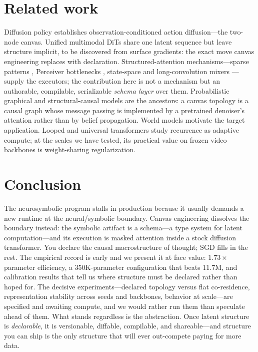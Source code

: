 \documentclass[10pt,twocolumn]{article}
\begin{document}
\section{Related work}

Diffusion policy \cite{chi2023diffusion} establishes observation-conditioned action diffusion---the two-node canvas. Unified multimodal DiTs \cite{peebles2023dit,yang2024cogvideox} share one latent sequence but leave structure implicit, to be discovered from surface gradients: the exact move canvas engineering replaces with declaration. Structured-attention mechanisms---sparse patterns \cite{child2019sparse}, Perceiver bottlenecks \cite{jaegle2021perceiver}, state-space and long-convolution mixers \cite{gu2023mamba,peng2023rwkv,poli2023hyena}---supply the executors; the contribution here is not a mechanism but an authorable, compilable, serializable \emph{schema layer} over them. Probabilistic graphical and structural-causal models \cite{koller2009pgm,pearl2009causality} are the ancestors: a canvas topology is a causal graph whose message passing is implemented by a pretrained denoiser's attention rather than by belief propagation. World models \cite{ha2018worldmodels,hafner2023dreamerv3,lecun2022path} motivate the target application. Looped and universal transformers \cite{dehghani2019universal,schwarzschild2021thinking} study recurrence as adaptive compute; at the scales we have tested, its practical value on frozen video backbones is weight-sharing regularization.

\section{Conclusion}

The neurosymbolic program stalls in production because it usually demands a new runtime at the neural/symbolic boundary. Canvas engineering dissolves the boundary instead: the symbolic artifact is a schema---a type system for latent computation---and its execution is masked attention inside a stock diffusion transformer. You declare the causal macrostructure of thought; SGD fills in the rest. The empirical record is early and we present it at face value: $1.73\times$ parameter efficiency, a 350K-parameter configuration that beats 11.7M, and calibration results that tell us where structure must be declared rather than hoped for. The decisive experiments---declared topology versus flat co-residence, representation stability across seeds and backbones, behavior at scale---are specified and awaiting compute, and we would rather run them than speculate ahead of them. What stands regardless is the abstraction. Once latent structure is \emph{declarable}, it is versionable, diffable, compilable, and shareable---and structure you can ship is the only structure that will ever out-compete paying for more data.
\end{document}
